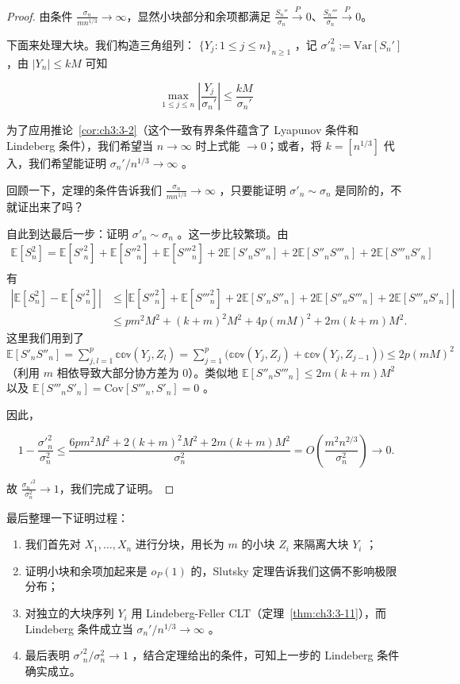 \begin{proof}
由条件 $\frac{\sigma_n}{mn^{1/3}}\to\infty$，显然小块部分和余项都满足 $\frac{S_n''}{\sigma_n}\overset{P}\to 0$、$\frac{S_n'''}{\sigma_n}\overset{P}\to 0$。

下面来处理大块。我们构造三角组列： $\{Y_j:1\le j\le n\}_{n\ge 1}$ ，记 $\sigma'^2_n:=\mathrm{Var}[S_n']$ ，由 $|Y_n|\le kM$ 可知

$$\max_{1\le j\le n} \left|\frac{Y_j}{\sigma_n'}\right|\le \frac{kM}{\sigma_n'}$$

为了应用推论~\ref{cor:ch3:3-2}（这个一致有界条件蕴含了 Lyapunov 条件和 Lindeberg 条件），我们希望当 $n\to\infty$ 时上式能 $\to 0$；或者，将 $k=[n^{1/3}]$ 代入，我们希望能证明 $\sigma_n'/n^{1/3}\to\infty$ 。

回顾一下，定理的条件告诉我们 $\frac{\sigma_n}{mn^{1/3}}\to\infty$ ，只要能证明 $\sigma'_n\sim \sigma_n$ 是同阶的，不就证出来了吗？

自此到达最后一步：证明 $\sigma'_n\sim \sigma_n$ 。这一步比较繁琐。由
\[\begin{aligned}\mathbb{E}[S^2_n] = \mathbb{E}[S'^2_n] + \mathbb{E}[S''^2_n] + \mathbb{E}[S'''^2_n] + 2\mathbb{E}[S'_n S''_n] + 2\mathbb{E}[S''_n S'''_n] + 2\mathbb{E}[S'''_n S'_n]\\ \end{aligned}\]
有\[\begin{aligned}
|\mathbb{E}[S^2_n] - \mathbb{E}[S'^2_n]|
&\leq |\mathbb{E}[S''^2_n] + \mathbb{E}[S'''^2_n] + 2\mathbb{E}[S'_n S''_n] + 2\mathbb{E}[S''_n S'''_n] + 2\mathbb{E}[S'''_n S'_n]|\\
&\leq p m^2 M^2 + (k + m)^2 M^2 + 4p(mM)^2 + 2m(k + m)M^2.
\end{aligned}\]这里我们用到了 $\mathbb{E}[S'_n S''_n] = \sum_{j,l=1}^p \mathbb{cov}(Y_j, Z_l) =\sum_{j=1}^p \big(\mathbb{cov}(Y_j, Z_j) + \mathbb{cov}(Y_j, Z_{j-1})\big) \leq 2p(mM)^2$（利用 $m$ 相依导致大部分协方差为 0）。类似地 $\mathbb{E}[S''_n S'''_n] \leq 2m(k + m)M^2$ 以及 $\mathbb{E}[S'''_n S'_n] = \mathrm{Cov}[S'''_n, S'_n] = 0$ 。

因此， 

\[
1 - \frac{\sigma'^2_n}{\sigma^2_n}
\leq \frac{6pm^2M^2 + 2(k + m)^2M^2 + 2m(k + m)M^2}{\sigma_n^2}
=O\left(\frac{m^2n^{2/3}}{\sigma_n^2}\right)\longrightarrow 0.
\]

故 $\frac{\sigma_n'^2}{\sigma_n^2}\to 1$，我们完成了证明。

\end{proof}
最后整理一下证明过程：

\begin{enumerate}
\def\labelenumi{\arabic{enumi}.}
\tightlist
\item
  我们首先对 $X_1,\dots,X_n$ 进行分块，用长为 $m$ 的小块 $Z_i$ 来隔离大块 $Y_i$ ；
\item
  证明小块和余项加起来是 $o_P(1)$ 的，Slutsky 定理告诉我们这俩不影响极限分布；
\item
  对独立的大块序列 $Y_i$ 用 Lindeberg-Feller CLT（定理~\ref{thm:ch3:3-11}），而 Lindeberg 条件成立当 $\sigma_n'/n^{1/3}\to\infty$ 。
\item
  最后表明 $\sigma'^2_n/\sigma_n^2\to 1$ ，结合定理给出的条件，可知上一步的 Lindeberg 条件确实成立。
\end{enumerate}


